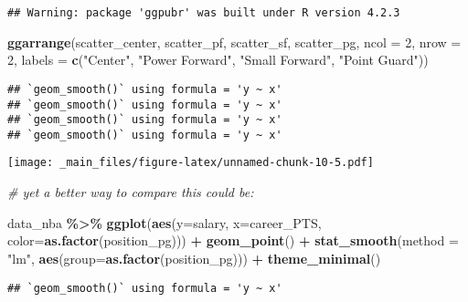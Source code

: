 \documentclass[
]{book}
\newenvironment{Shaded}{\begin{snugshade}}{\end{snugshade}}
\newcommand{\AttributeTok}[1]{\textcolor[rgb]{0.13,0.29,0.53}{#1}}
\newcommand{\CommentTok}[1]{\textcolor[rgb]{0.56,0.35,0.01}{\textit{#1}}}
\newcommand{\DecValTok}[1]{\textcolor[rgb]{0.00,0.00,0.81}{#1}}
\newcommand{\FunctionTok}[1]{\textcolor[rgb]{0.13,0.29,0.53}{\textbf{#1}}}
\newcommand{\NormalTok}[1]{#1}
\newcommand{\SpecialCharTok}[1]{\textcolor[rgb]{0.81,0.36,0.00}{\textbf{#1}}}
\newcommand{\StringTok}[1]{\textcolor[rgb]{0.31,0.60,0.02}{#1}}
\begin{document}
\begin{verbatim}
## Warning: package 'ggpubr' was built under R version 4.2.3
\end{verbatim}

\begin{Shaded}
\begin{Highlighting}[]
\FunctionTok{ggarrange}\NormalTok{(scatter\_center, scatter\_pf,}
\NormalTok{          scatter\_sf, scatter\_pg,}
          \AttributeTok{ncol =} \DecValTok{2}\NormalTok{, }\AttributeTok{nrow =} \DecValTok{2}\NormalTok{,}
          \AttributeTok{labels =} \FunctionTok{c}\NormalTok{(}\StringTok{"Center"}\NormalTok{,}
                     \StringTok{"Power Forward"}\NormalTok{,}
                     \StringTok{"Small Forward"}\NormalTok{,}
                     \StringTok{"Point Guard"}\NormalTok{))}
\end{Highlighting}
\end{Shaded}

\begin{verbatim}
## `geom_smooth()` using formula = 'y ~ x'
## `geom_smooth()` using formula = 'y ~ x'
## `geom_smooth()` using formula = 'y ~ x'
## `geom_smooth()` using formula = 'y ~ x'
\end{verbatim}

\texttt{[image: \_main\_files/figure-latex/unnamed-chunk-10-5.pdf]}

\begin{Shaded}
\begin{Highlighting}[]
\CommentTok{\# yet a better way to compare this could be:}

\NormalTok{data\_nba }\SpecialCharTok{\%\textgreater{}\%} 
  \FunctionTok{ggplot}\NormalTok{(}\FunctionTok{aes}\NormalTok{(}\AttributeTok{y=}\NormalTok{salary, }\AttributeTok{x=}\NormalTok{career\_PTS, }\AttributeTok{color=}\FunctionTok{as.factor}\NormalTok{(position\_pg))) }\SpecialCharTok{+}
    \FunctionTok{geom\_point}\NormalTok{() }\SpecialCharTok{+} 
     \FunctionTok{stat\_smooth}\NormalTok{(}\AttributeTok{method =} \StringTok{"lm"}\NormalTok{,}
                 \FunctionTok{aes}\NormalTok{(}\AttributeTok{group=}\FunctionTok{as.factor}\NormalTok{(position\_pg))) }\SpecialCharTok{+} 
       \FunctionTok{theme\_minimal}\NormalTok{()}
\end{Highlighting}
\end{Shaded}

\begin{verbatim}
## `geom_smooth()` using formula = 'y ~ x'
\end{verbatim}
\end{document}
